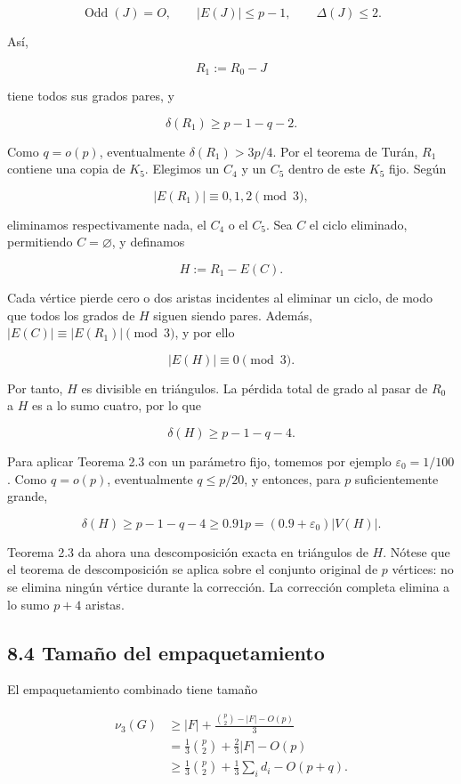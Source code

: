\documentclass[
  spanish,
  11pt,
  a4paper,
]{article}
\begin{document}
\[
\operatorname{Odd}(J)=O,
\qquad
|E(J)|\le p-1,
\qquad
\Delta(J)\le2.
\tag{8.6}
\]

Así,

\[
R_1:=R_0-J
\]

tiene todos sus grados pares, y

\[
\delta(R_1)\ge p-1-q-2.
\tag{8.7}
\]

Como \(q=o(p)\), eventualmente \(\delta(R_1)>3p/4\). Por el teorema de Turán, \(R_1\) contiene una copia de \(K_5\). Elegimos un \(C_4\) y un \(C_5\) dentro de este \(K_5\) fijo. Según

\[
|E(R_1)|\equiv0,1,2\pmod3,
\]

eliminamos respectivamente nada, el \(C_4\) o el \(C_5\). Sea \(C\) el ciclo eliminado, permitiendo \(C=\varnothing\), y definamos

\[
H:=R_1-E(C).
\]

Cada vértice pierde cero o dos aristas incidentes al eliminar un ciclo, de modo que todos los grados de \(H\) siguen siendo pares. Además, \(|E(C)|\equiv |E(R_1)|\pmod3\), y por ello

\[
|E(H)|\equiv0\pmod3.
\]

Por tanto, \(H\) es divisible en triángulos. La pérdida total de grado al pasar de \(R_0\) a \(H\) es a lo sumo cuatro, por lo que

\[
\delta(H)\ge p-1-q-4.
\tag{8.8}
\]

Para aplicar Teorema 2.3 con un parámetro fijo, tomemos por ejemplo \(\varepsilon_0=1/100\). Como \(q=o(p)\), eventualmente \(q\le p/20\), y entonces, para \(p\) suficientemente grande,

\[
\delta(H)\ge p-1-q-4\ge0.91p=(0.9+\varepsilon_0)|V(H)|.
\tag{8.9}
\]

Teorema 2.3 da ahora una descomposición exacta en triángulos de \(H\). Nótese que el teorema de descomposición se aplica sobre el conjunto original de \(p\) vértices: no se elimina ningún vértice durante la corrección. La corrección completa elimina a lo sumo \(p+4\) aristas.

\subsection{8.4 Tamaño del empaquetamiento}\label{tamauxf1o-del-empaquetamiento}

El empaquetamiento combinado tiene tamaño

\[
\begin{aligned}
\nu_3(G)
&\ge
|F|+\frac{\binom p2-|F|-O(p)}3\\
&=
\frac13\binom p2+\frac23|F|-O(p)\\
&\ge
\frac13\binom p2+\frac13\sum_i d_i-O(p+q).
\end{aligned}
\tag{8.10}
\]
\end{document}
